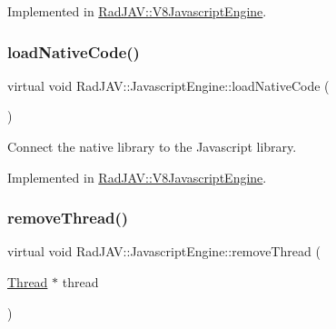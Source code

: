 Implemented in \mbox{\hyperlink{class_rad_j_a_v_1_1_v8_javascript_engine_a23fcc70cb6805867951748fd1c9706f1}{Rad\+J\+A\+V\+::\+V8\+Javascript\+Engine}}.

\mbox{\label{class_rad_j_a_v_1_1_javascript_engine_a91b208b07958c50ce906cd9f25eed669}} 
\subsubsection{\texorpdfstring{load\+Native\+Code()}{loadNativeCode()}}
{\footnotesize\ttfamily virtual void Rad\+J\+A\+V\+::\+Javascript\+Engine\+::load\+Native\+Code (\begin{DoxyParamCaption}{ }\end{DoxyParamCaption})\hspace{0.3cm}{\ttfamily [pure virtual]}}



Connect the native library to the Javascript library. 



Implemented in \mbox{\hyperlink{class_rad_j_a_v_1_1_v8_javascript_engine_afd8d4baa780d5ee7a77754eb5ca52e4d}{Rad\+J\+A\+V\+::\+V8\+Javascript\+Engine}}.

\mbox{\label{class_rad_j_a_v_1_1_javascript_engine_afe08c6324e3958a5d3ec82fa9e0f1fd1}} 
\subsubsection{\texorpdfstring{remove\+Thread()}{removeThread()}}
{\footnotesize\ttfamily virtual void Rad\+J\+A\+V\+::\+Javascript\+Engine\+::remove\+Thread (\begin{DoxyParamCaption}\item[{\mbox{\hyperlink{class_rad_j_a_v_1_1_thread}{Thread}} $\ast$}]{thread }\end{DoxyParamCaption})\hspace{0.3cm}{\ttfamily [pure virtual]}}



